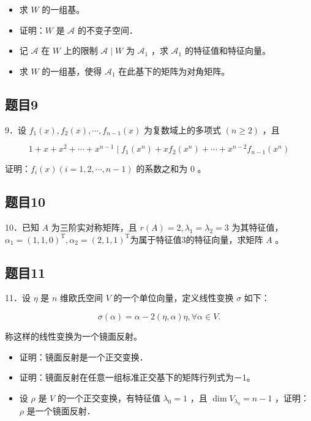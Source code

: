 \documentclass{article}
\begin{document}
\begin{itemize}
  \item[（1）] 求 \(W\) 的一组基。
  \item[（2）] 证明：\(W\) 是 \(\mathcal{A}\) 的不变子空间．
  \item[（3）] 记 \(\mathcal{A}\) 在 \(W\) 上的限制 \(\mathcal{A} \mid W\) 为 \(\mathcal{A}_{1}\) ，求 \(\mathcal{A}_{1}\) 的特征值和特征向量。
  \item[（4）] 求 \(W\) 的一组基，使得 \(\mathcal{A}_{1}\) 在此基下的矩阵为对角矩阵。
\end{itemize}

\subsection{题目9}
9．设 \(f_{1}(x), f_{2}(x), \cdots, f_{n-1}(x)\) 为复数域上的多项式 \((n \geq 2)\) ，且

\[
1+x+x^{2}+\cdots+x^{n-1} \mid f_{1}\left(x^{n}\right)+x f_{2}\left(x^{n}\right)+\cdots+x^{n-2} f_{n-1}\left(x^{n}\right)
\]

证明：\(f_{i}(x)(i=1,2, \cdots, n-1)\) 的系数之和为 0 。

\subsection{题目10}
10．已知 \(A\) 为三阶实对称矩阵，且 \(r(A)=2, \lambda_{1}=\lambda_{2}=3\) 为其特征值，\(\alpha_{1}=(1,1,0)^{\mathrm{T}}, \alpha_{2}=(2,1,1)^{\mathrm{T}}\)为属于特征值3的特征向量，求矩阵 \(A\) 。

\subsection{题目11}
11．设 \(\eta\) 是 \(n\) 维欧氏空间 \(V\) 的一个单位向量，定义线性变换 \(\sigma\) 如下：

\[
\sigma(\alpha)=\alpha-2(\eta, \alpha) \eta, \forall \alpha \in V .
\]

称这样的线性变换为一个镜面反射。

\begin{itemize}
  \item[（1）] 证明：镜面反射是一个正交变换．
  \item[（2）] 证明：镜面反射在任意一组标准正交基下的矩阵行列式为－1。
  \item[（3）] 设 \(\rho\) 是 \(V\) 的一个正交变换，有特征值 \(\lambda_{0}=1\) ，且 \(\operatorname{dim} V_{\lambda_{0}}=n-1\) ，证明：\(\rho\) 是一个镜面反射．
\end{itemize}
\end{document}
